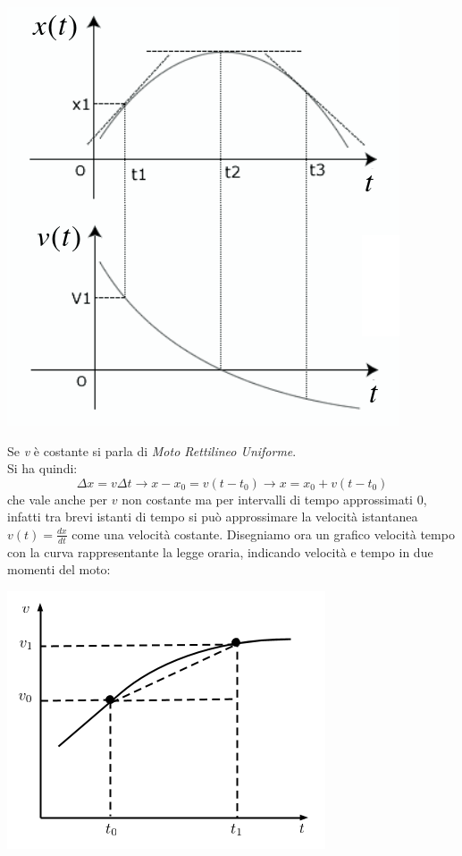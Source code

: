 \documentclass[a4paper,12pt, oneside]{book}
\begin{document}
\begin{center}
\includegraphics[scale=0.36]{img/ist.png}
\end{center}
Se \textit{v} è costante si parla di \textit{Moto Rettilineo Uniforme}. \\
Si ha quindi:
$$\Delta x = v\Delta t\to x-x_0=v(t-t_0)\to x=x_0+v(t-t_0)$$
che vale anche per $v$ non costante ma per intervalli di tempo approssimati 0, infatti tra brevi istanti di tempo si può approssimare la velocità istantanea $v(t)=\frac{dx}{dt}$ come una velocità costante. Disegniamo ora un grafico velocità tempo con la curva rappresentante la legge oraria, indicando velocità e tempo in due momenti del moto:
\begin{center}
\includegraphics[scale=0.5]{img/gra.png}
\end{center}
\end{document}
